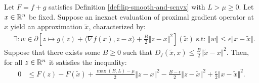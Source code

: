 \documentclass[12pt]{article}
\begin{document}
        \begin{lemma}\label{lemma:inex-pg-ineq}
            Let $F = f + g$ satisfies Definition \ref{def:lip-smooth-and-scnvx} with $L > \mu \ge 0$. 
            Let $x \in \mathbb R^n$ be fixed. 
            Suppose an inexact evaluation of proximal gradient operator at $x$ yield an approximation $\tilde x$, characterized by: 
            \begin{align*}
                & \exists: w \in \partial \left[
                    z \mapsto  g(z) + \langle \nabla f(x), z - x\rangle + \frac{B}{2}\Vert z - x\Vert^2
                \right](\tilde x)\; \text{s.t: } \Vert w\Vert \le \epsilon \Vert x - \tilde x\Vert. 
            \end{align*}
            Suppose that there exists some $B \ge 0$ such that $D_f(\tilde x, x) \le \frac{B}{2}\Vert \tilde x - x\Vert^2$. 
            Then, for all $z\in \mathbb R^n$ it satisfies the inequality: 
            \begin{align*}
                0 &\le 
                F(z) - F(\tilde x) + \frac{\max(B, L) - \mu}{2}\Vert z - x\Vert^2
                - \frac{B - \epsilon}{2}\Vert z - \tilde x\Vert^2
                + \frac{\epsilon}{2}\Vert x - \tilde x \Vert^2. 
            \end{align*}
        \end{lemma}
\end{document}
